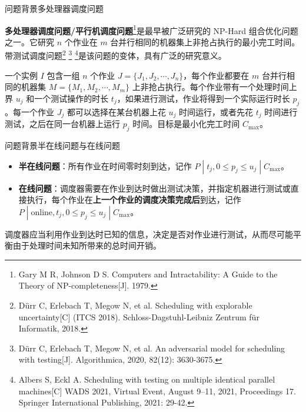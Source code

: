 \newcommand{\zts}[1]{\textcolor{zts}{\textbf{#1}}}

\begin{frame}{问题背景}{多处理器调度问题}

\zts{多处理器调度问题/平行机调度问题}\footnote[1]{Gary M R, Johnson D S. Computers and Intractability: A Guide to the Theory of NP-completeness[J]. 1979.}是最早被广泛研究的 NP-Hard 组合优化问题之一。它研究 $n$ 个作业在 $m$ 台并行相同的机器集上非抢占执行的最小完工时间。带测试调度问题\footnote[2]{Dürr C, Erlebach T, Megow N, et al. Scheduling with explorable uncertainty[C] (ITCS 2018). Schloss-Dagstuhl-Leibniz Zentrum für Informatik, 2018.}
\footnote[3]{Dürr C, Erlebach T, Megow N, et al. An adversarial model for scheduling with testing[J]. Algorithmica, 2020, 82(12): 3630-3675.}
\footnote[4]{Albers S, Eckl A. Scheduling with testing on multiple identical parallel machines[C] WADS 2021, Virtual Event, August 9–11, 2021, Proceedings 17. Springer International Publishing, 2021: 29-42.}是该问题的变体，具有广泛的研究意义。

\begin{probl}[带测试多处理器调度问题]
一个实例 $I$ 包含一组 $n$ 个作业 $J = \{J_1, J_2, \cdots, J_n\}$，每个作业都要在 $m$ 台并行相同的机器集 $M = \{M_1, M_2, \cdots, M_m\}$ 上非抢占执行。每个作业带有一个处理时间上界 $u_j$ 和一个测试操作的时长 $t_j$，如果进行测试，作业将得到一个实际运行时长 $p_j$。每一个作业 $J_j$ 都可以选择在某台机器上花 $u_j$ 时间运行，或者先花 $t_j$ 时间进行测试，之后在同一台机器上运行 $p_j$ 时间。目标是最小化完工时间 $C_{\text{max}}$。
\end{probl}

\end{frame}

\begin{frame}{问题背景}{半在线问题与在线问题}

\begin{itemize}
    \item \textcolor{zts}{\textbf{半在线问题}}：所有作业在时间零时刻到达，记作 $P\;|\;t_j,0\leq p_j\leq u_j\;|\;C_{\text{max}}$。
    \item \textcolor{zts}{\textbf{在线问题}}：调度器需要在作业到达时做出测试决策，并指定机器进行测试或直接执行，每个作业在\textbf{上一个作业的调度决策完成后}到达，记作 $P \; | \; \text{online}, t_j, 0\leq p_j \leq u_j \; | \; C_{\text{max}}$。
\end{itemize}

调度器应当利用作业到达时已知的信息，决定是否对作业进行测试，从而尽可能平衡由于处理时间未知所带来的总时间开销。

\end{frame}

